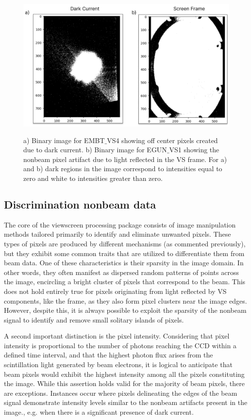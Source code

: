 \documentclass{article}
\begin{document}
\begin{figure}[!h]  
    \centerline{\ \includegraphics[width=\linewidth]{images/example_nonbeam_pixel_aberrations.png}}
    \caption{a) Binary image for EMBT$\_$VS4 showing off center pixels created due to dark current. b) Binary image for EGUN$\_$VS1 showing the nonbeam pixel artifact due to light reflected in the VS frame. For a) and b) dark regions in the image correspond to intensities equal to zero and white to intensities greater than zero.}
    \label{fig:7}
\end{figure} 


\subsection{Discrimination nonbeam data}

The core of the viewscreen processing package consists of image manipulation methods tailored primarily to identify and eliminate unwanted pixels. These types of pixels are produced by different mechanisms (as commented previously), but they exhibit some common traits that are utilized to differentiate them from beam data. One of these characteristics is their sparsity in the image domain. In other words, they often manifest as dispersed random patterns of points across the image, encircling a bright cluster of pixels that correspond to the beam. This does not hold entirely true for pixels originating from light reflected by VS components,  like the frame, as they also form pixel clusters near the image edges. However, despite this, it is always possible to exploit the sparsity of the nonbeam signal to identify and remove small solitary islands of pixels.

A second important distinction is the pixel intensity. Considering that pixel intensity is proportional to the number of photons reaching the CCD within a defined time interval, and that the highest photon flux arises from the scintillation light generated by beam electrons, it is logical to anticipate that beam pixels would exhibit the highest intensity among all the pixels constituting the image. While this assertion holds valid for the majority of beam pixels, there are exceptions. Instances occur where pixels delineating the edges of the beam signal demonstrate intensity levels similar to the nonbeam artifacts present in the image., e.g. when there is a significant presence of dark current.   
\end{document}
